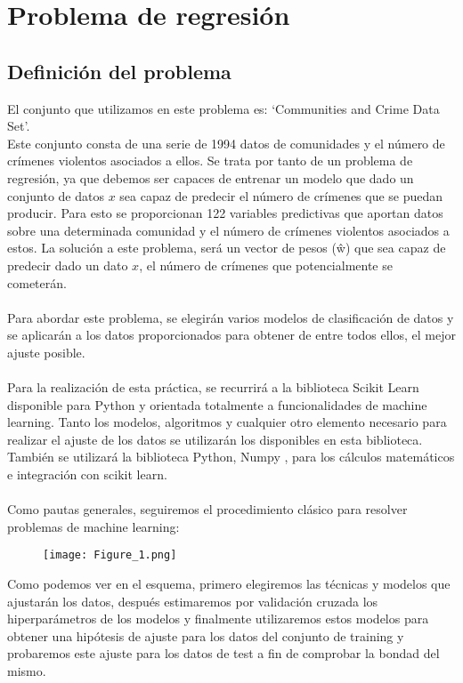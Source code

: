\chapter{Problema de regresión}
\section{Definición del problema}
El conjunto que utilizamos en este problema es: `Communities and Crime Data Set'. \cite{Communities}\\
Este conjunto consta de una serie de 1994 datos de comunidades y el número de crímenes violentos asociados a ellos. Se trata por tanto de un problema de regresión, ya que debemos ser capaces de entrenar un modelo que dado un conjunto de datos $x$ sea capaz de predecir el número de crímenes que se puedan producir. Para esto se proporcionan 122 variables predictivas que aportan datos sobre una determinada comunidad y el número de crímenes violentos asociados a estos. La solución a este problema, será un vector de pesos (ŵ) que sea capaz de predecir dado un dato $x$, el número de crímenes que potencialmente se cometerán.
\\\\
Para abordar este problema, se elegirán varios modelos de clasificación de datos y se aplicarán a los datos proporcionados para obtener de entre todos ellos, el mejor ajuste posible.\\
\\
Para la realización de esta práctica, se recurrirá a la biblioteca Scikit Learn \cite{SkUG} \cite{SkAPI} disponible para Python y orientada totalmente a funcionalidades de machine learning. Tanto los modelos, algoritmos y cualquier otro elemento necesario para realizar el ajuste de los datos se utilizarán los disponibles en esta biblioteca. También se utilizará la biblioteca Python, Numpy \cite{Numpy}, para los cálculos matemáticos e integración con scikit learn.\\
\\
Como pautas generales, seguiremos el procedimiento clásico para resolver problemas de machine learning:

\begin{figure}[h]
   \centering
   \texttt{[image: Figure\_1.png]}
\end{figure}

Como podemos ver en el esquema, primero elegiremos las técnicas y modelos que ajustarán los datos, después estimaremos por validación cruzada los hiperparámetros de los modelos y finalmente utilizaremos estos modelos para obtener una hipótesis de ajuste para los datos del conjunto de training y probaremos este ajuste para los datos de test a fin de comprobar la bondad del mismo.

